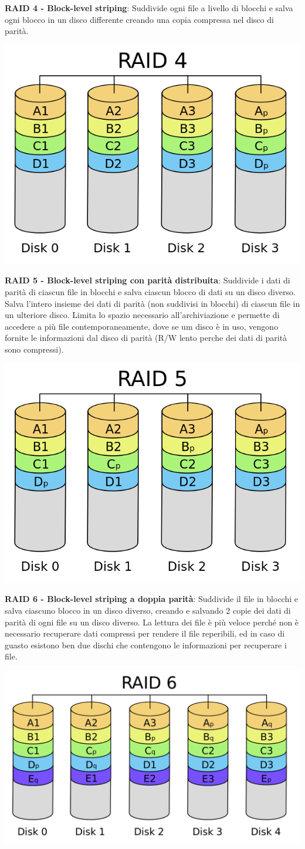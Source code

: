 \documentclass[8pt,a4paper]{extarticle}
\begin{document}
\begin{multicols*}{4}
\begin{center}
  		\end{center}
\textbf{RAID 4 - Block-level striping}: Suddivide ogni file a livello di blocchi e salva ogni blocco in un disco differente creando una copia compressa nel disco di parità.
		\begin{center}
    			\includegraphics[width=.5\linewidth]{src/raid4.png}
  		\end{center}
\textbf{RAID 5 - Block-level striping con parità distribuita}: Suddivide i dati di parità di ciascun file in blocchi e salva ciascun blocco di dati su un disco diverso. Salva l’intero insieme dei dati di parità (non suddivisi in blocchi) di ciascun file in un ulteriore disco. Limita lo spazio necessario all’archiviazione e permette di accedere a più file contemporaneamente, dove se um disco è in uso, vengono fornite le informazioni dal disco di parità (R/W lento perche dei dati di parità sono compressi).
		\begin{center}
    			\includegraphics[width=.5\linewidth]{src/raid5.png}
  		\end{center}
\textbf{RAID 6 -  Block-level striping a doppia parità}: Suddivide il file in blocchi e salva ciascuno blocco in un disco diverso, creando e salvando 2 copie dei dati di parità di ogni file su un disco diverso. La lettura dei file è più veloce perché non è necessario recuperare dati compressi per rendere il file reperibili, ed in caso di guasto esistono ben due dischi che contengono le informazioni per recuperare i file.
		\begin{center}
    			\includegraphics[width=.5\linewidth]{src/raid6.png}

\end{center}
\end{multicols*}
\end{document}
